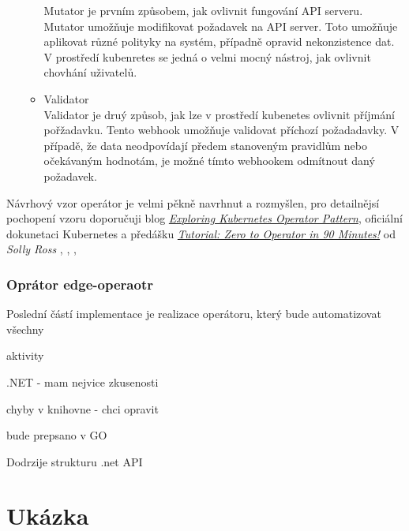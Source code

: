 \begin{itemize}
\begin{itemize}
        Mutator je prvním způsobem, jak ovlivnit fungování API serveru. Mutator umožňuje modifikovat požadavek na API server. Toto umožňuje aplikovat různé polityky na systém, případně opravid nekonzistence dat. V prostředí kubenretes se jedná o velmi mocný nástroj, jak ovlivnit chovhání uživatelů.  
        \item Validator\\
        Validator je druý způsob, jak lze v prostředí kubenetes ovlivnit příjmání pořžadavku. Tento webhook umožňuje validovat příchozí požadadavky. V případě, že data neodpovídají předem stanoveným pravidlům nebo očekávaným hodnotám, je možné tímto webhookem odmítnout daný požadavek.
    \end{itemize}
\end{itemize}
Návrhový vzor operátor je velmi pěkně navrhnut a rozmyšlen, pro detailnějsí pochopení vzoru doporučuji blog \href{https://iximiuz.com/en/posts/kubernetes-operator-pattern/}{\textit{Exploring Kubernetes Operator Pattern}}, oficiální dokunetaci Kubernetes a předášku \href{https://youtu.be/KBTXBUVNF2I}{\textit{Tutorial: Zero to Operator in 90 Minutes!}} od \textit{Solly Ross}
 \cite{bhler_2021_kubeops},
 \cite{kaplan_2022_argocd},
 \cite{velichko_2021_exploring},
 \cite{cncfcloudnativecomputingfoundation_2020_tutorial}

\subsubsection{Oprátor edge-operaotr}
Poslední částí implementace je realizace operátoru, který bude automatizovat všechny

aktivity

.NET - mam nejvice zkusenosti

chyby v knihovne - chci opravit

bude prepsano v GO

Dodrzije strukturu .net API

\section{Ukázka}
